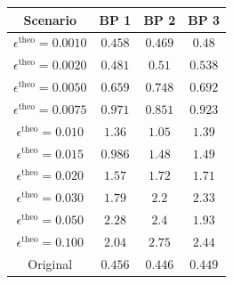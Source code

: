 \begin{tabular}{|c||c|c|c|}
\hline
Scenario & BP 1 & BP 2 & BP 3\\
\hline\hline
$\epsilon^{\text{theo}}=0.0010$ & $0.458$ & $0.469$ & $0.48$\\\hline
$\epsilon^{\text{theo}}=0.0020$ & $0.481$ & $0.51$ & $0.538$\\\hline
$\epsilon^{\text{theo}}=0.0050$ & $0.659$ & $0.748$ & $0.692$\\\hline
$\epsilon^{\text{theo}}=0.0075$ & $0.971$ & $0.851$ & $0.923$\\\hline
$\epsilon^{\text{theo}}=0.010$ & $1.36$ & $1.05$ & $1.39$\\\hline
$\epsilon^{\text{theo}}=0.015$ & $0.986$ & $1.48$ & $1.49$\\\hline
$\epsilon^{\text{theo}}=0.020$ & $1.57$ & $1.72$ & $1.71$\\\hline
$\epsilon^{\text{theo}}=0.030$ & $1.79$ & $2.2$ & $2.33$\\\hline
$\epsilon^{\text{theo}}=0.050$ & $2.28$ & $2.4$ & $1.93$\\\hline
$\epsilon^{\text{theo}}=0.100$ & $2.04$ & $2.75$ & $2.44$\\\hline
Original & $0.456$ & $0.446$ & $0.449$\\
\hline
\end{tabular}
